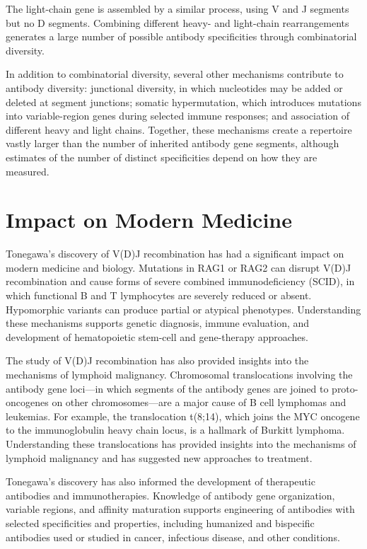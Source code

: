 The light-chain gene is assembled by a similar process, using V and J segments but no D segments. Combining different heavy- and light-chain rearrangements generates a large number of possible antibody specificities through combinatorial diversity.

In addition to combinatorial diversity, several other mechanisms contribute to antibody diversity: junctional diversity, in which nucleotides may be added or deleted at segment junctions; somatic hypermutation, which introduces mutations into variable-region genes during selected immune responses; and association of different heavy and light chains. Together, these mechanisms create a repertoire vastly larger than the number of inherited antibody gene segments, although estimates of the number of distinct specificities depend on how they are measured.

\section{Impact on Modern Medicine}

Tonegawa's discovery of V(D)J recombination has had a significant impact on modern medicine and biology. Mutations in RAG1 or RAG2 can disrupt V(D)J recombination and cause forms of severe combined immunodeficiency (SCID), in which functional B and T lymphocytes are severely reduced or absent. Hypomorphic variants can produce partial or atypical phenotypes. Understanding these mechanisms supports genetic diagnosis, immune evaluation, and development of hematopoietic stem-cell and gene-therapy approaches.

The study of V(D)J recombination has also provided insights into the mechanisms of lymphoid malignancy. Chromosomal translocations involving the antibody gene loci---in which segments of the antibody genes are joined to proto-oncogenes on other chromosomes---are a major cause of B cell lymphomas and leukemias. For example, the translocation t(8;14), which joins the MYC oncogene to the immunoglobulin heavy chain locus, is a hallmark of Burkitt lymphoma. Understanding these translocations has provided insights into the mechanisms of lymphoid malignancy and has suggested new approaches to treatment.

Tonegawa's discovery has also informed the development of therapeutic antibodies and immunotherapies. Knowledge of antibody gene organization, variable regions, and affinity maturation supports engineering of antibodies with selected specificities and properties, including humanized and bispecific antibodies used or studied in cancer, infectious disease, and other conditions.

